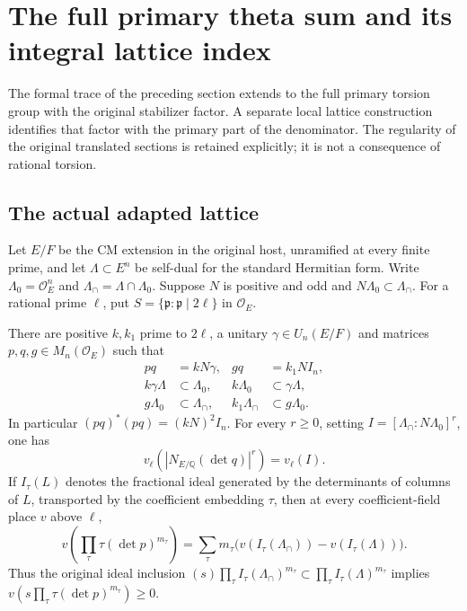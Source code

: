 \section{The full primary theta sum and its integral lattice index}
\label{sec:geometry-primary-trace}

The formal trace of the preceding section extends to the full primary
torsion group with the original stabilizer factor.  A separate local
lattice construction identifies that factor with the primary part of
the denominator.  The regularity of the original translated sections
is retained explicitly; it is not a consequence of rational torsion.

\subsection*{The actual adapted lattice}

Let $E/F$ be the CM extension in the original host, unramified at every
finite prime, and let $\Lambda\subset E^n$ be self-dual for the standard
Hermitian form.  Write $\Lambda_0=\mathcal O_E^n$ and
$\Lambda_\cap=\Lambda\cap\Lambda_0$.  Suppose $N$ is positive and odd and
$N\Lambda_0\subset\Lambda_\cap$.  For a rational prime $\ell$, put
$S=\{\mathfrak p:\mathfrak p\mid2\ell\}$ in $\mathcal O_E$.

\begin{proposition}\label{prop:primary-adapted-construction}
There are positive $k,k_1$ prime to $2\ell$, a unitary
$\gamma\in U_n(E/F)$ and matrices $p,q,g\in M_n(\mathcal O_E)$ such that
\begin{align}
 pq&=kN\gamma,&gq&=k_1N I_n,\\
 k\gamma\Lambda&\subset\Lambda_0,&
 k\Lambda_0&\subset\gamma\Lambda,\\
 g\Lambda_0&\subset\Lambda_\cap,&
 k_1\Lambda_\cap&\subset g\Lambda_0.
 \label{eq:primary-adapted-data}
\end{align}
In particular $(pq)^*(pq)=(kN)^2I_n$.  For every $r\geq0$, setting
$I=[\Lambda_\cap:N\Lambda_0]^r$, one has
\begin{equation}\label{eq:primary-index}
 v_\ell\!\left(|N_{E/\mathbb Q}(\det q)|^r\right)=v_\ell(I).
\end{equation}
If $I_\tau(L)$ denotes the fractional ideal generated by the determinants
of columns of $L$, transported by the coefficient embedding $\tau$,
then at every coefficient-field place $v$ above $\ell$,
\begin{equation}\label{eq:primary-det-ideal}
 v\!\left(\prod_\tau\tau(\det p)^{m_\tau}\right)
 =\sum_\tau m_\tau\bigl(v(I_\tau(\Lambda_\cap))
                         -v(I_\tau(\Lambda))\bigr).
\end{equation}
Thus the original ideal inclusion
$(s)\prod_\tau I_\tau(\Lambda_\cap)^{m_\tau}
 \subset\prod_\tau I_\tau(\Lambda)^{m_\tau}$ implies
$v(s\prod_\tau\tau(\det p)^{m_\tau})\geq0$.
\end{proposition}

